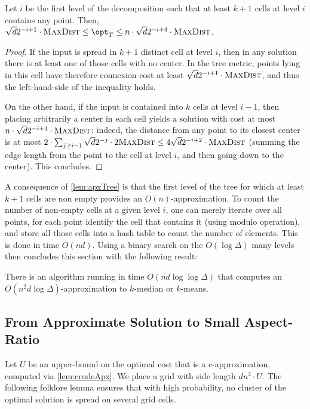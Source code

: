\begin{lemma}\label{lem:apxTree}
Let $i$ be the first level of the decomposition such that at least $k+1$ cells at level $i$ contains any point. Then, $\sqrt{d}2^{-i+1} \cdot \boxsize \leq \opt_T \leq n \cdot \sqrt{d}2^{-i+4} \cdot \boxsize$.
\end{lemma}
\begin{proof}
If the input is spread in $k+1$ distinct cell at level $i$, then in any solution there is at least one of those cells with no center. In the tree metric, points lying in this cell have therefore connexion cost at least $\sqrt{d}2^{-i+1} \cdot \textsc{MaxDist}$, and thus the left-hand-side of the inequality holds.

On the other hand, if the input is contained into $k$ cells at level $i-1$, then placing arbitrarily a center in each cell yields a solution with cost at most $n \cdot \sqrt{d}2^{-i+4} \cdot \textsc{MaxDist}$: indeed, the distance from any point to its closest center is at most $2 \cdot \sum_{j \geq i-1} \sqrt{d}2^{-j} \cdot 2\textsc{MaxDist} \leq 4 \sqrt{d}2^{-i+2} \cdot \textsc{MaxDist}$ (summing the edge length from the point to the cell at level $i$, and then going down to the center). This concludes.
\end{proof}

A consequence of \cref{lem:apxTree} is that the first level of the tree for which at least $k+1$ cells are non empty provides an $O(n)$-approximation. 
To count the number of non-empty cells at a given level $i$, one can merely iterate over all points, for each point identify the cell that contains it (using modulo operation), and store all those cells into a hash table to count the number of elements. This is done in time $O(nd)$.
Using a binary search on the $O(\log \Delta)$ many levels then concludes this section with the following result:

\begin{lemma}\label{lem:crudeApx}
There is an algorithm running in time $O(nd \log \log \Delta)$ that computes an  $O(n^2 d \log \Delta)$-approximation to $k$-median or $k$-means.
\end{lemma}

\subsection{From Approximate Solution to Small Aspect-Ratio}
Let $U$ be an upper-bound on the optimal cost that is a $c$-approximation, computed via \cref{lem:crudeApx}. We place a grid with side length $d n^2\cdot U$.
The following folklore lemma ensures that with high probability, no cluster of the optimal solution is spread on several grid cells.

